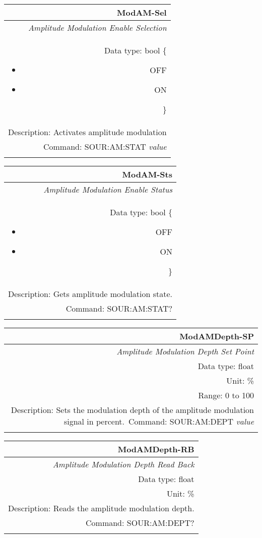 \documentclass[openany]{article}
\begin{document}
		\begin{tabular}{N}
			\hline
			\bfseries ModAM-Sel \\ \hline
			\emph{Amplitude Modulation Enable Selection} \\
			Data type: bool \{\begin{itemize}[noitemsep]
				\small
				\item[] OFF
				\item[] ON
			\end{itemize}\} \\
			Description: Activates amplitude modulation\\
			Command: SOUR:AM:STAT \emph{value} \\
			\\

		\end{tabular}


		\begin{tabular}{N}
			\hline
			\bfseries ModAM-Sts \\ \hline
			\emph{Amplitude Modulation Enable Status} \\
			Data type: bool \{\begin{itemize}[noitemsep]
				\small
				\item[] OFF
				\item[] ON
			\end{itemize}\} \\
			Description: Gets amplitude modulation state. \\
			Command: SOUR:AM:STAT? \\
			\\
			
		\end{tabular}


		\begin{tabular}{N}
			\hline
			\bfseries ModAMDepth-SP \\ \hline
			\emph{Amplitude Modulation Depth Set Point} \\
			Data type: float \\
			Unit: \% \\
			Range: 0 to 100 \\
			Description: Sets the modulation depth of the amplitude modulation signal in percent.\
			Command: SOUR:AM:DEPT \emph{value} \\
			\\
			
		\end{tabular}


		\begin{tabular}{N}
			\hline
			\bfseries ModAMDepth-RB \\ \hline
			\emph{Amplitude Modulation Depth Read Back} \\
			Data type: float \\
			Unit: \% \\
			Description: Reads the amplitude modulation depth. \\
			Command: SOUR:AM:DEPT? \\
			\\

		\end{tabular}
\end{document}
